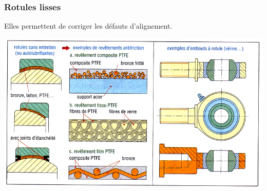 \documentclass[11pt,oneside]{article}
\begin{document}

\subsubsection{Rotules lisses}
Elles permettent de corriger les défauts d'alignement. 
\begin{center}
\includegraphics[width=.75\textwidth]{png/fig17}
\end{center}
\end{document}
